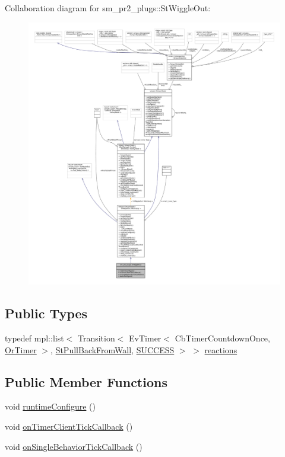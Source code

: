 Collaboration diagram for sm\+\_\+pr2\+\_\+plugs\+:\+:St\+Wiggle\+Out\+:
\nopagebreak
\begin{figure}[H]
\begin{center}
\leavevmode
\includegraphics[width=350pt]{structsm__pr2__plugs_1_1StWiggleOut__coll__graph}
\end{center}
\end{figure}
\subsection*{Public Types}
\begin{DoxyCompactItemize}
\item 
typedef mpl\+::list$<$ Transition$<$ Ev\+Timer$<$ Cb\+Timer\+Countdown\+Once, \hyperlink{classsm__pr2__plugs_1_1OrTimer}{Or\+Timer} $>$, \hyperlink{structsm__pr2__plugs_1_1StPullBackFromWall}{St\+Pull\+Back\+From\+Wall}, \hyperlink{classSUCCESS}{S\+U\+C\+C\+E\+SS} $>$ $>$ \hyperlink{structsm__pr2__plugs_1_1StWiggleOut_a7984b3c4a0d48be520994c08bb97d328}{reactions}
\end{DoxyCompactItemize}
\subsection*{Public Member Functions}
\begin{DoxyCompactItemize}
\item 
void \hyperlink{structsm__pr2__plugs_1_1StWiggleOut_a6fa24859d089ed61fcea478ed3b23cce}{runtime\+Configure} ()
\item 
void \hyperlink{structsm__pr2__plugs_1_1StWiggleOut_a5a3ebd3e28a35bbcb63600cb4f5e5265}{on\+Timer\+Client\+Tick\+Callback} ()
\item 
void \hyperlink{structsm__pr2__plugs_1_1StWiggleOut_a569b162bc13388ec2f3812bd538b5cf4}{on\+Single\+Behavior\+Tick\+Callback} ()
\end{DoxyCompactItemize}
